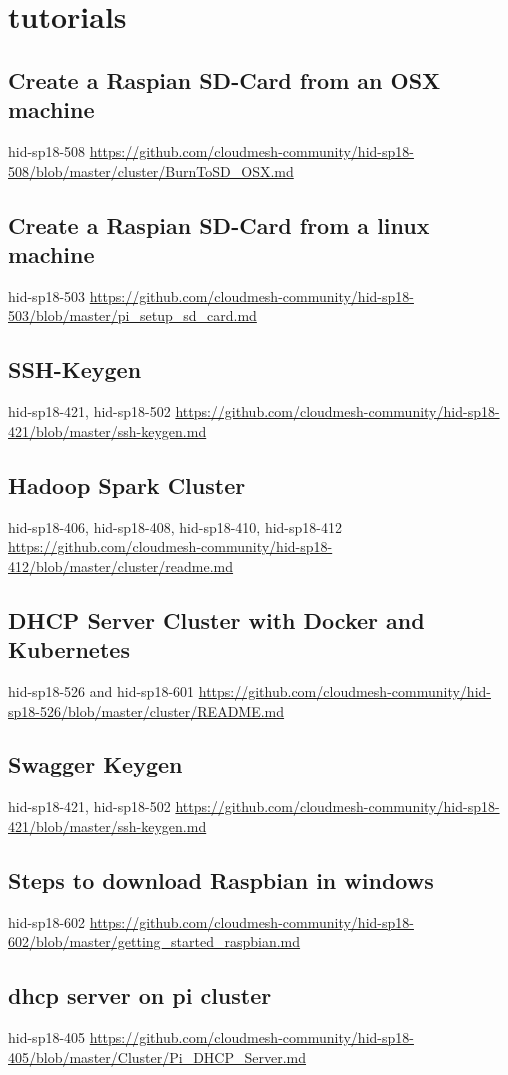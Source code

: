 \chapter{tutorials}

\section{Create a Raspian SD-Card from an OSX machine}
hid-sp18-508
\url{https://github.com/cloudmesh-community/hid-sp18-508/blob/master/cluster/BurnToSD_OSX.md}


\section{Create a Raspian SD-Card from a linux machine}
hid-sp18-503 
\url{https://github.com/cloudmesh-community/hid-sp18-503/blob/master/pi_setup_sd_card.md}

\section{SSH-Keygen}
hid-sp18-421, hid-sp18-502
\url{https://github.com/cloudmesh-community/hid-sp18-421/blob/master/ssh-keygen.md}


\section{Hadoop Spark Cluster }
hid-sp18-406,  hid-sp18-408, hid-sp18-410, hid-sp18-412
\url{https://github.com/cloudmesh-community/hid-sp18-412/blob/master/cluster/readme.md}

 

\section{DHCP Server Cluster with Docker and Kubernetes }
hid-sp18-526 and hid-sp18-601
\url{https://github.com/cloudmesh-community/hid-sp18-526/blob/master/cluster/README.md}


\section{Swagger Keygen}
hid-sp18-421, hid-sp18-502
\url{https://github.com/cloudmesh-community/hid-sp18-421/blob/master/ssh-keygen.md}

\section{Steps to download Raspbian in windows}
hid-sp18-602
\url{https://github.com/cloudmesh-community/hid-sp18-602/blob/master/getting_started_raspbian.md}

\section{dhcp server on pi cluster}
hid-sp18-405 
\url{https://github.com/cloudmesh-community/hid-sp18-405/blob/master/Cluster/Pi_DHCP_Server.md}

